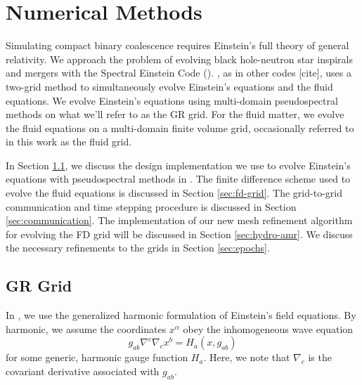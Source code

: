 \chapter{Numerical Methods}
\label{chap:chapter-3}
	
Simulating compact binary coalescence requires Einstein's full theory of general relativity.
We approach the problem of evolving black hole-neutron star inspirals and mergers with the Spectral Einstein Code (\SpEC).  
\SpEC, as in other codes [cite], uses a two-grid method to simultaneously evolve Einstein's equations and the fluid equations.
We evolve Einstein's equations using multi-domain pseudospectral methods on what we'll refer to as the GR grid.
For the fluid matter, we evolve the fluid equations on a multi-domain finite volume grid, occasionally referred to in this work as the fluid grid.

In Section \ref{sec:gr-grid}, we discuss the design implementation we use to evolve Einstein's equations with pseudospectral methods in \SpEC.  The finite difference scheme used to evolve the fluid equations is discussed in Section \ref{sec:fd-grid}.  The grid-to-grid communication and time stepping procedure is discussed in Section \ref{sec:communication}.  The implementation of our new mesh refinement algorithm for evolving the FD grid will be discussed in Section \ref{sec:hydro-amr}.  We discuss the necessary refinements to the grids in Section \ref{sec:epochs}.

\section{GR Grid}
\label{sec:gr-grid}

In \SpEC, we use the generalized harmonic formulation of Einstein's field equations.  By harmonic, we assume the coordinates $x^\alpha$ obey the inhomogeneous  wave equation
\begin{equation}
g_{ab} \nabla^c \nabla_c x^b = H_a (x, g_{ab})
\end{equation}
for some generic, harmonic gauge function $H_a$.  Here, we note that $\nabla_c$ is the covariant derivative associated with $g_{ab}$.  

